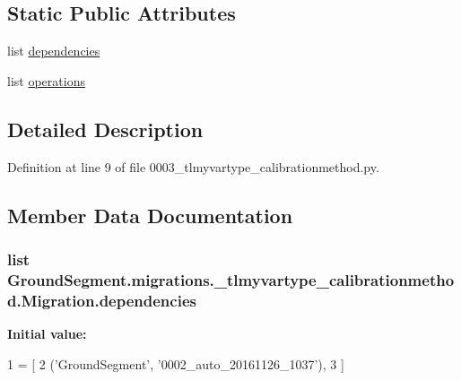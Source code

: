 \subsection*{Static Public Attributes}
\begin{DoxyCompactItemize}
\item 
list \hyperlink{class_ground_segment_1_1migrations_1_10003__tlmyvartype__calibrationmethod_1_1_migration_acbd1ae8732c9bd38de02e9cf1fd5e3e7}{dependencies}
\item 
list \hyperlink{class_ground_segment_1_1migrations_1_10003__tlmyvartype__calibrationmethod_1_1_migration_aad75bdb1b8ddb059354afe32362f044e}{operations}
\end{DoxyCompactItemize}


\subsection{Detailed Description}


Definition at line 9 of file 0003\+\_\+tlmyvartype\+\_\+calibrationmethod.\+py.



\subsection{Member Data Documentation}
\hypertarget{class_ground_segment_1_1migrations_1_10003__tlmyvartype__calibrationmethod_1_1_migration_acbd1ae8732c9bd38de02e9cf1fd5e3e7}{}
\subsubsection[{dependencies}]{\setlength{\rightskip}{0pt plus 5cm}list Ground\+Segment.\+migrations.\+\_\+tlmyvartype\+\_\+calibrationmethod.\+Migration.\+dependencies\hspace{0.3cm}{\ttfamily [static]}}\label{class_ground_segment_1_1migrations_1_10003__tlmyvartype__calibrationmethod_1_1_migration_acbd1ae8732c9bd38de02e9cf1fd5e3e7}
{\bfseries Initial value\+:}
\begin{DoxyCode}
1 = [
2         (\textcolor{stringliteral}{'GroundSegment'}, \textcolor{stringliteral}{'0002\_auto\_20161126\_1037'}),
3     ]
\end{DoxyCode}


